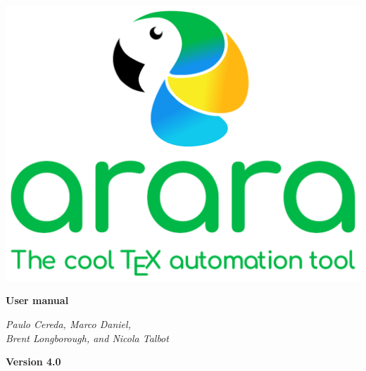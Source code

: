 \documentclass[a4paper,oneside,12pt]{memoir}
\newcommand{\araraversion}{4.0}
\begin{document}
\begin{titlingpage}
\vspace*{2em}

\begin{center}
\includegraphics[scale=0.7]{logos/logo2.pdf}

\vspace{4em}

\begin{tcolorbox}[
  boxrule=0pt,
  colback=araracolour,
  top=1em,
  bottom=1em
]
  \color{white}
  \centering
  \Huge
  \sffamily
  \bfseries User manual
\end{tcolorbox}

\vspace{6em}

{\large\em Paulo Cereda, Marco Daniel,\\
Brent Longborough, and Nicola Talbot\par}

\vspace{3em}

\href{mailto:cereda.paulo@gmail.com}{}%
\quad\href{https://github.com/cereda/arara}{}%
\quad\href{http://twitter.com/paulocereda}{}

\vfill

{\color{araracolour}
\LARGE
\sffamily
\bfseries
Version \araraversion}

\end{center}
\end{titlingpage}

\pagestyle{headings}
\frontmatter
\nouppercaseheads
\end{document}
